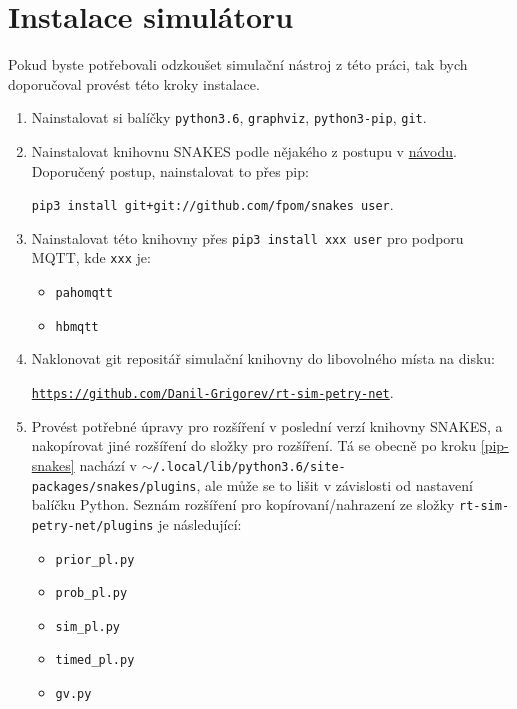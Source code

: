 \section{Instalace simulátoru}
Pokud byste potřebovali odzkoušet simulační nástroj z této práci, tak bych doporučoval provést této kroky instalace.
\begin{enumerate}
    \item Nainstalovat si balíčky \texttt{python3.6}, \texttt{graphviz}, \texttt{python3-pip}, \texttt{git}.
    \item Nainstalovat knihovnu SNAKES podle nějakého z postupu v \href{https://www.ibisc.univ-evry.fr/~fpommereau/SNAKES/first-steps-with-snakes.html}{návodu}. \label{pip-snakes}
    Doporučený postup, nainstalovat to přes pip:

    \texttt{pip3 install git+git://github.com/fpom/snakes \-\-user}.
    \item Nainstalovat této knihovny přes \texttt{pip3 install xxx \-\-user} pro podporu MQTT, kde \texttt{xxx} je:
    \begin{itemize}
        \item \texttt{pahomqtt}
        \item \texttt{hbmqtt}
    \end{itemize}
    \item Naklonovat git repositář simulační knihovny do libovolného místa na disku:

    \href{https://github.com/Danil-Grigorev/rt-sim-petry-net}{\texttt{https://github.com/Danil-Grigorev/rt-sim-petry-net}}.
    \item Provést potřebné úpravy pro rozšíření  v poslední verzí knihovny SNAKES, a nakopírovat jiné rozšíření do složky pro rozšíření. Tá se obecně po kroku \ref{pip-snakes} nachází v \texttt{$\sim$/.local/lib/python3.6/site-packages/snakes/plugins}, ale může se to lišit v závislosti od nastavení balíčku Python. Seznám rozšíření pro kopírovaní/nahrazení ze složky \texttt{rt-sim-petry-net/plugins} je následující:
    \begin{itemize}
        \item \texttt{prior\_pl.py}
        \item \texttt{prob\_pl.py}
        \item \texttt{sim\_pl.py}
        \item \texttt{timed\_pl.py}
        \item \texttt{gv.py}
    \end{itemize}

\end{enumerate}

